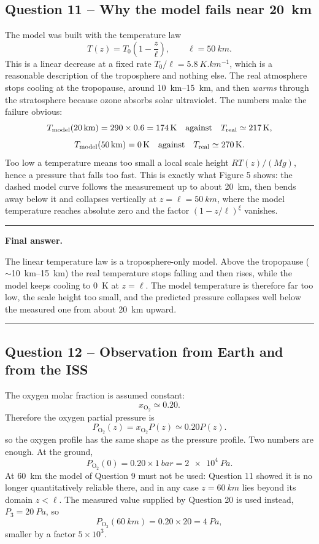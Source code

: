 \documentclass[11pt,a4paper]{article}
\newenvironment{finalanswer}{%
  \begin{center}\begin{minipage}{0.94\linewidth}\hrule\vspace{0.45em}\textbf{Final answer. }%
}{%
  \vspace{0.45em}\hrule\end{minipage}\end{center}%
}
\newcommand{\Otwo}{\ensuremath{\mathrm{O}_2}}
\begin{document}
\subsection*{Question 11 -- Why the model fails near \SI{20}{km}}

The model was built with the temperature law
\[
 T(z)=T_0\left(1-\frac{z}{\ell}\right),\qquad \ell=\SI{50}{km}.
\]
This is a linear decrease at a fixed rate $T_0/\ell=\SI{5.8}{K.km^{-1}}$, which is
a reasonable description of the troposphere and nothing else. The real
atmosphere stops cooling at the tropopause, around \SIrange{10}{15}{km}, and then
\emph{warms} through the stratosphere because ozone absorbs solar ultraviolet.
The numbers make the failure obvious:
\[
 T_{\rm model}(\SI{20}{km})=290\times0.6=\SI{174}{K}
 \quad\text{against}\quad
 T_{\rm real}\simeq\SI{217}{K},
\]
\[
 T_{\rm model}(\SI{50}{km})=\SI{0}{K}
 \quad\text{against}\quad
 T_{\rm real}\simeq\SI{270}{K}.
\]
Too low a temperature means too small a local scale height $RT(z)/(Mg)$, hence a
pressure that falls too fast. This is exactly what Figure 5 shows: the dashed
model curve follows the measurement up to about \SI{20}{km}, then bends away
below it and collapses vertically at $z=\ell=\SI{50}{km}$, where the model
temperature reaches absolute zero and the factor $(1-z/\ell)^{\xi}$ vanishes.

\begin{finalanswer}
The linear temperature law is a troposphere-only model. Above the tropopause ($\sim$\SIrange{10}{15}{km}) the real temperature stops falling and then rises, while the model keeps cooling to \SI{0}{K} at $z=\ell$. The model temperature is therefore far too low, the scale height too small, and the predicted pressure collapses well below the measured one from about \SI{20}{km} upward.
\end{finalanswer}

\subsection*{Question 12 -- Observation from Earth and from the ISS}

The oxygen molar fraction is assumed constant:
\[
 x_{\Otwo}\simeq 0.20.
\]
Therefore the oxygen partial pressure is
\[
 P_{\Otwo}(z)=x_{\Otwo}P(z)\simeq0.20P(z).
\]
so the oxygen profile has the same shape as the pressure profile. Two numbers
are enough. At the ground,
\[
 P_{\Otwo}(0)=0.20\times\SI{1}{bar}=\SI{2e4}{Pa}.
\]
At \SI{60}{km} the model of Question 9 must not be used: Question 11 showed it is
no longer quantitatively reliable there, and in any case $z=\SI{60}{km}$ lies
beyond its domain $z<\ell$. The measured value supplied by Question 20 is used
instead, $P_3=\SI{20}{Pa}$, so
\[
 P_{\Otwo}(\SI{60}{km})=0.20\times20=\SI{4}{Pa},
\]
smaller by a factor $5\times10^{3}$.
\end{document}
